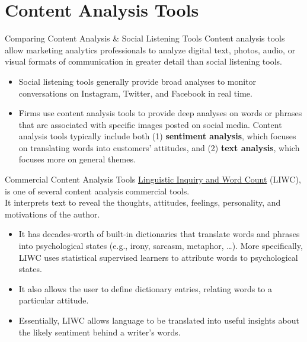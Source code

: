 \documentclass[pdf]{beamer}
\newcommand{\empr}[1]{{\color{franklinblue}\textbf{#1}}}
\theoremstyle{remark}
\theoremstyle{definition}
\begin{document}
\section{Content Analysis Tools}

\begin{frame}[t]{Comparing Content Analysis \& Social Listening Tools}
Content analysis tools allow marketing analytics professionals to analyze digital text, photos, audio, or visual formats of communication in greater detail than social listening tools. \\
\vspace{1.5ex}
\begin{itemize}
\item Social listening tools generally provide broad analyses to monitor conversations on Instagram, Twitter, and Facebook in real time. 
\item Firms use content analysis tools to provide deep analyses on words or phrases that are associated with specific images posted on social media. Content analysis tools typically include both (1) \empr{sentiment analysis}, which focuses on translating words into customers' attitudes, and (2) \empr{text analysis}, which focuses more on general themes.
\end{itemize}
\end{frame}

\begin{frame}[t]{Commercial Content Analysis Tools}
\href{https://www.liwc.app/}{Linguistic Inquiry and Word Count} (LIWC), %
is one of several content analysis commercial tools. \\
\vspace{1.5ex}
It interprets text to reveal the thoughts, attitudes, feelings, personality, and motivations of the author. 
\begin{itemize}
\item It has decades-worth of built-in dictionaries that translate words and phrases into psychological states (e.g., irony, sarcasm, metaphor, \ldots).  More specifically, LIWC uses statistical supervised learners to attribute words to psychological states.
\item It also allows the user to define dictionary entries, relating words to a particular attitude. 
\item Essentially, LIWC allows language to be translated into useful insights about the likely sentiment behind a writer's words.
\end{itemize}
\end{frame}
\end{document}
